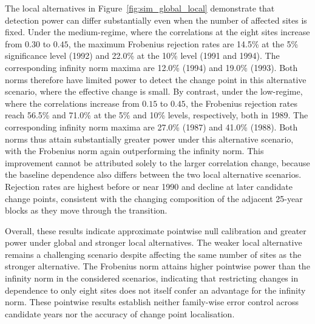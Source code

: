 \documentclass[APA,STIX1COL]{WileyNJD-v2}
\begin{document}
The local alternatives in Figure~\ref{fig:sim_global_local} demonstrate that detection power can differ substantially even when the number of affected sites is fixed. 
Under the medium-regime, where the correlations at the eight sites increase from $0.30$ to $0.45$, the maximum Frobenius rejection rates are 14.5\% at the 5\% significance level (1992) and 22.0\% at the 10\% level (1991 and 1994).
The corresponding infinity norm maxima are 12.0\% (1994) and 19.0\% (1993). Both norms therefore have limited power to detect the change point in this alternative scenario, where the effective change is small.
By contrast, under the low-regime, where the correlations increase from $0.15$ to $0.45$, the Frobenius rejection rates reach 56.5\% and 71.0\% at the 5\% and 10\% levels, respectively, both in 1989.
The corresponding infinity norm maxima are 27.0\% (1987) and 41.0\% (1988). Both norms thus attain substantially greater power under this alternative scenario, with the Frobenius norm again outperforming the infinity norm.
This improvement cannot be attributed solely to the larger correlation change, because the baseline dependence also differs between the two local alternative scenarios. Rejection rates are highest before or near 1990 and decline at later candidate change points, consistent with the changing composition of the adjacent 25-year blocks as they move through the transition.

Overall, these results indicate approximate pointwise null calibration and greater power under global and stronger local alternatives.
The weaker local alternative remains a challenging scenario despite affecting the same number of sites as the stronger alternative.
The Frobenius norm attains higher pointwise power than the infinity norm in the considered scenarios, indicating that restricting changes in dependence to only eight sites does not itself confer an advantage for the infinity norm. These pointwise results establish neither family-wise error control across candidate years nor the accuracy of change point localisation.
\end{document}
